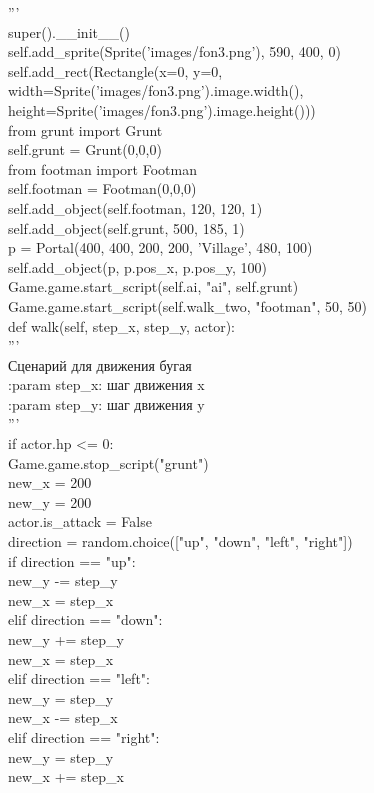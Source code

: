 '''\\
super().\_\_init\_\_()\\
self.add\_sprite(Sprite('images/fon3.png'), 590, 400, 0)\\
self.add\_rect(Rectangle(x=0, y=0, width=Sprite('images/fon3.png').image.width(), height=Sprite('images/fon3.png').image.height()))\\
from grunt import Grunt\\
self.grunt = Grunt(0,0,0)\\
from footman import Footman\\
self.footman = Footman(0,0,0)\\
self.add\_object(self.footman, 120, 120, 1)\\
self.add\_object(self.grunt, 500, 185, 1)\\
p = Portal(400, 400, 200, 200, 'Village', 480, 100)\\
self.add\_object(p, p.pos\_x, p.pos\_y, 100)\\
Game.game.start\_script(self.ai, "ai", self.grunt)\\
Game.game.start\_script(self.walk\_two, "footman", 50, 50)\\


def walk(self, step\_x, step\_y, actor):\\
'''\\
Сценарий для движения бугая\\

:param step\_x: шаг движения x\\
:param step\_y: шаг движения y\\
'''\\
if actor.hp <= 0:\\
Game.game.stop\_script("grunt")\\
new\_x = 200\\
new\_y = 200\\
actor.is\_attack = False\\
direction = random.choice(["up", "down", "left", "right"])\\
if direction == "up":\\
new\_y -= step\_y\\
new\_x = step\_x\\
elif direction == "down":\\
new\_y += step\_y\\
new\_x = step\_x\\
elif direction == "left":\\
new\_y = step\_y\\
new\_x -= step\_x\\
elif direction == "right":\\
new\_y = step\_y\\
new\_x += step\_x\\

